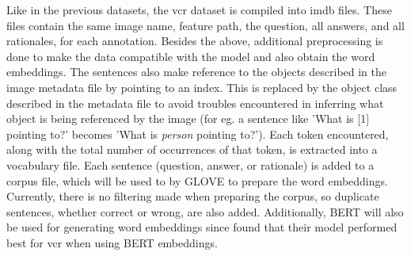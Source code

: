 Like in the previous datasets, the \gls{vcr} dataset is compiled into \gls{imdb} files.
These files contain the same image name, feature path, the question, all answers, and all rationales, for each annotation.
Besides the above, additional preprocessing is done to make the data compatible with the model and also obtain the word embeddings.
The sentences also make reference to the objects described in the image metadata file by pointing to an index.
This is replaced by the object class described in the metadata file to avoid troubles encountered in inferring what object is being referenced by the image (for eg. a sentence like 'What is [1] pointing to?' becomes 'What is \textit{person} pointing to?').
Each token encountered, along with the total number of occurrences of that token, is extracted into a vocabulary file.
Each sentence (question, answer, or rationale) is added to a \gls{corpus} file, which will be used to by GLOVE to prepare the word embeddings.
Currently, there is no filtering made when preparing the corpus, so duplicate sentences, whether correct or wrong, are also added.
Additionally, BERT will also be used for generating word embeddings since \citeauthor{zellers_recognition_2019} found that their model performed best for \gls{vcr} when using BERT embeddings\cite{zellers_recognition_2019}.
